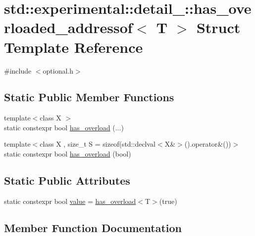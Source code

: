 \hypertarget{structstd_1_1experimental_1_1detail___1_1has__overloaded__addressof}{}\section{std\+:\+:experimental\+:\+:detail\+\_\+\+:\+:has\+\_\+overloaded\+\_\+addressof$<$ T $>$ Struct Template Reference}
\label{structstd_1_1experimental_1_1detail___1_1has__overloaded__addressof}


{\ttfamily \#include $<$optional.\+h$>$}

\subsection*{Static Public Member Functions}
\begin{DoxyCompactItemize}
\item 
{\footnotesize template$<$class X $>$ }\\static constexpr bool \mbox{\hyperlink{structstd_1_1experimental_1_1detail___1_1has__overloaded__addressof_a4656eb4d63080eef6563dca4894f8623}{has\+\_\+overload}} (...)
\item 
{\footnotesize template$<$class X , size\+\_\+t S = sizeof(std\+::declval$<$\+X\&$>$().\+operator\&())$>$ }\\static constexpr bool \mbox{\hyperlink{structstd_1_1experimental_1_1detail___1_1has__overloaded__addressof_a3afc4b4cc2df22327c0f380cec60fb1f}{has\+\_\+overload}} (bool)
\end{DoxyCompactItemize}
\subsection*{Static Public Attributes}
\begin{DoxyCompactItemize}
\item 
static constexpr bool \mbox{\hyperlink{structstd_1_1experimental_1_1detail___1_1has__overloaded__addressof_a7ff16212ecdca54a0328b1cb4d676cf9}{value}} = \mbox{\hyperlink{structstd_1_1experimental_1_1detail___1_1has__overloaded__addressof_a4656eb4d63080eef6563dca4894f8623}{has\+\_\+overload}}$<$T$>$(true)
\end{DoxyCompactItemize}


\subsection{Member Function Documentation}
\mbox{\label{structstd_1_1experimental_1_1detail___1_1has__overloaded__addressof_a4656eb4d63080eef6563dca4894f8623}} 
